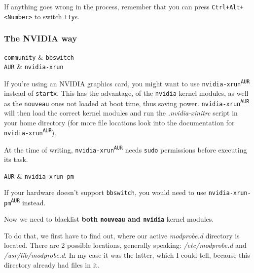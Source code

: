 \documentclass[10pt]{dustdoc}
\begin{document}
If anything goes wrong in the process, remember that you can press \texttt{Ctrl+\allowbreak{}Alt+\allowbreak{}<Number>} to switch \texttt{tty}s.

\subsubsection{The NVIDIA way}
\label{sec:the-nvidia-way}

\begin{packagetable}
    \texttt{community} & \texttt{bbswitch} \\ 
    \texttt{AUR} & \texttt{nvidia-xrun} \\ 
\end{packagetable}

If you’re using an NVIDIA graphics card, you might want to use \texttt{nvidia-xrun\textsuperscript{\texttt{AUR}}} instead of \texttt{startx}.
This has the advantage, of the \texttt{nvidia} kernel modules, as well as the \texttt{nouveau} ones not loaded at boot time, thus saving power.
\texttt{nvidia-xrun\textsuperscript{\texttt{AUR}}} will then load the correct kernel modules and run the \textit{.nvidia-xinitrc} script in your home directory (for more file locations look into the documentation for \texttt{nvidia-xrun\textsuperscript{\texttt{AUR}}}).

\begin{IMPORTANT}
    At the time of writing, \texttt{nvidia-xrun\textsuperscript{\texttt{AUR}}} needs \texttt{sudo} permissions before executing its task.
\end{IMPORTANT}

\begin{NOTE}
    \begin{packagetable}
        \texttt{AUR} & \texttt{nvidia-xrun-pm} \\ 
    \end{packagetable}

    If your hardware doesn’t support \texttt{bbswitch}, you would need to use \texttt{nvidia-xrun-pm\textsuperscript{\texttt{AUR}}} instead.
\end{NOTE}

Now we need to blacklist \textbf{both \texttt{nouveau} and \texttt{nvidia}} kernel modules.

To do that, we first have to find out, where our active \textit{modprobe.d} directory is located.
There are 2 possible locations, generally speaking: \textit{/etc/modprobe.d} and \textit{/usr/lib/modprobe.d}.
In my case it was the latter, which I could tell, because this directory already had files in it.
\end{document}
